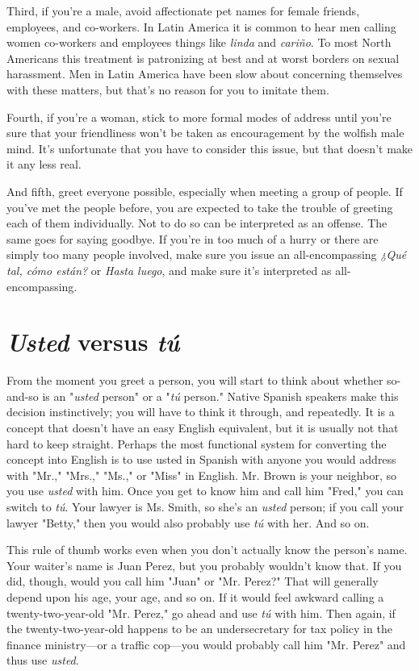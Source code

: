 \documentclass[14pt,a4paper,oneside]{memoir}
\begin{document}
Third, if you're a male, avoid affectionate pet names for female
friends, employees, and co-workers. In Latin America it is common to
hear men calling women co-workers and employees things like \emph{linda}
and \emph{cariño}. To most North Americans this treatment is patronizing at
best and at worst borders on sexual harassment. Men in Latin America
have been slow about concerning themselves with these matters, but
that's no reason for you to imitate them.

Fourth, if you're a woman, stick to more formal modes of address until you're sure that your friendliness won't be taken as encouragement by the wolfish male mind. It's unfortunate that you have to
consider this issue, but that doesn't make it any less real.

And fifth, greet everyone possible, especially when meeting
a group of people. If you've met the people before, you are expected
to take the trouble of greeting each of them individually. Not to do
so can be interpreted as an offense. The same goes for saying goodbye. If you're in too much of a hurry or there are simply too many
people involved, make sure you issue an all-encompassing \emph{¿Qué tal,
cómo están?} or \emph{Hasta luego}, and make sure it's interpreted as all-encompassing.

\section{\emph{Usted} versus \emph{tú}}

From the moment you greet a person, you will start to think
about whether so-and-so is an "\emph{usted} person" or a "\emph{tú} person." Native
Spanish speakers make this decision instinctively; you will have to
think it through, and repeatedly. It is a concept that doesn't have an
easy English equivalent, but it is usually not that hard to keep straight.
Perhaps the most functional system for converting the concept into
English is to use usted in Spanish with anyone you would address with
"Mr.," "Mrs.," "Ms.," or "Miss" in English. Mr. Brown is your neighbor, so you use \emph{usted} with him. Once you get to know him and call
him "Fred," you can switch to \emph{tú}. Your lawyer is Ms. Smith, so she's
an \emph{usted} person; if you call your lawyer "Betty," then you would also
probably use \emph{tú} with her. And so on.

This rule of thumb works even when you don't actually know
the person's name. Your waiter's name is Juan Perez, but you probably
wouldn't know that. If you did, though, would you call him "Juan" or
"Mr. Perez?" That will generally depend upon his age, your age, and so
on. If it would feel awkward calling a twenty-two-year-old "Mr. Perez,"
go ahead and use \emph{tú} with him. Then again, if the twenty-two-year-old
happens to be an undersecretary for tax policy in the finance ministry---or a traffic cop---you would probably call him "Mr. Perez" and
thus use \emph{usted}.
\end{document}
